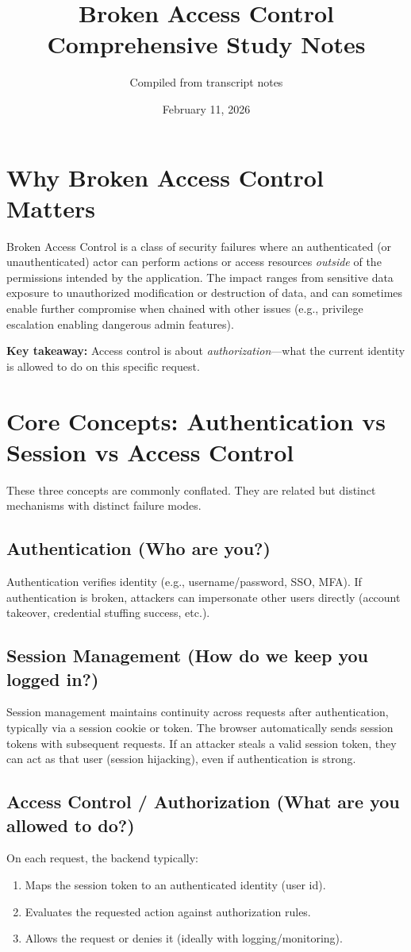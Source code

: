 \documentclass[11pt]{article}
\title{Broken Access Control\\\large Comprehensive Study Notes}
\author{Compiled from transcript notes}
\date{February 11, 2026}
\newcommand{\KeyTakeaway}[1]{%
  \vspace{0.5em}
  \noindent\textbf{Key takeaway:} #1
  \vspace{0.5em}
}
\begin{document}
\maketitle
\tableofcontents
\newpage

\section{Why Broken Access Control Matters}
Broken Access Control is a class of security failures where an authenticated (or unauthenticated) actor can perform actions or access resources \emph{outside} of the permissions intended by the application. The impact ranges from sensitive data exposure to unauthorized modification or destruction of data, and can sometimes enable further compromise when chained with other issues (e.g., privilege escalation enabling dangerous admin features).

\KeyTakeaway{Access control is about \emph{authorization}---what the current identity is allowed to do on this specific request.}

\section{Core Concepts: Authentication vs Session vs Access Control}
These three concepts are commonly conflated. They are related but distinct mechanisms with distinct failure modes.

\subsection{Authentication (Who are you?)}
Authentication verifies identity (e.g., username/password, SSO, MFA). If authentication is broken, attackers can impersonate other users directly (account takeover, credential stuffing success, etc.).

\subsection{Session Management (How do we keep you logged in?)}
Session management maintains continuity across requests after authentication, typically via a session cookie or token. The browser automatically sends session tokens with subsequent requests. If an attacker steals a valid session token, they can act as that user (session hijacking), even if authentication is strong.

\subsection{Access Control / Authorization (What are you allowed to do?)}
On each request, the backend typically:
\begin{enumerate}
  \item Maps the session token to an authenticated identity (user id).
  \item Evaluates the requested action against authorization rules.
  \item Allows the request or denies it (ideally with logging/monitoring).
\end{enumerate}
\end{document}
